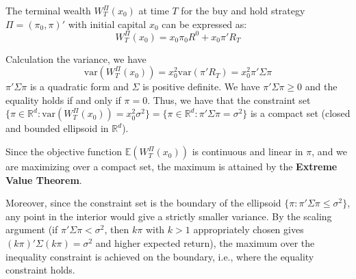 \begin{answer}
    \rpos
    \begin{answerenum}
        \item The terminal wealth \( W_T^{\Pi}(x_0) \) at time \( T \) for the buy and hold strategy \( \Pi = (\pi_0, \pi)' \) with initial capital \( x_0 \) can be expressed as:
            \[
            W_T^{\Pi}(x_0) = x_0 \pi_0 R^0 + x_0 \pi' R_T
            \]
        \item Calculation the variance, we have
            \[
            \mathrm{var}(W_T^{\Pi}(x_0)) = x_0^2 \mathrm{var}(\pi' R_T) = x_0^2 \pi' \Sigma \pi
            \]
            \( \pi' \Sigma \pi \) is a quadratic form and \( \Sigma \) is positive definite. 
            We have \( \pi' \Sigma \pi \geq 0 \) and the equality holds if and only if \( \pi = 0 \). Thus, we have that the constraint set \( \{\pi \in \mathbb{R}^d : \mathrm{var}(W_T^{\Pi}(x_0)) = x_0^2\sigma^2\} = \{\pi \in \mathbb{R}^d : \pi' \Sigma \pi = \sigma^2\} \) is a compact set (closed and bounded ellipsoid in \( \mathbb{R}^d \)).

            Since the objective function \( \mathbb{E}(W_T^{\Pi}(x_0)) \) is continuous and linear in \( \pi \), and we are maximizing over a compact set, the maximum is attained by the \textbf{Extreme Value Theorem}.

            Moreover, since the constraint set is the boundary of the ellipsoid \( \{\pi : \pi' \Sigma \pi \leq \sigma^2\} \), any point in the interior would give a strictly smaller variance. By the scaling argument (if \( \pi' \Sigma \pi < \sigma^2 \), then \( k\pi \) with \( k > 1 \) appropriately chosen gives \( (k\pi)' \Sigma (k\pi) = \sigma^2 \) and higher expected return), the maximum over the inequality constraint is achieved on the boundary, i.e., where the equality constraint holds.
    \end{answerenum}
\end{answer}